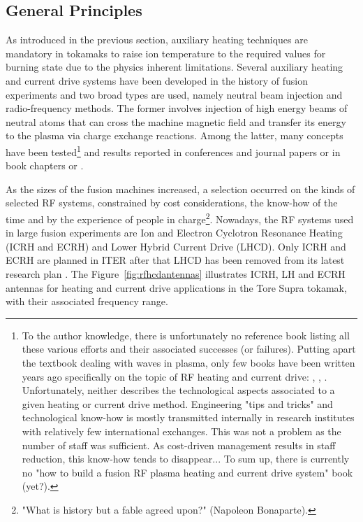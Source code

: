 \subsection{General Principles}
As introduced in the previous section, auxiliary heating techniques are mandatory in tokamaks to raise ion temperature to the required values for burning state due to the physics inherent limitations. Several auxiliary heating and current drive systems have been developed in the history of fusion experiments and two broad types are used, namely neutral beam injection and radio-frequency methods. %
The former involves injection of high energy beams of neutral atoms that can cross the machine magnetic field and transfer its energy to the plasma via charge exchange reactions. Among the latter, many concepts have been tested\footnote{To the author knowledge, there is unfortunately no reference book listing all these various efforts and their associated successes (or failures). Putting apart the textbook dealing with waves in plasma, only few books have been written years ago specifically on the topic of RF heating and current drive: , , . Unfortunately, neither describes the technological aspects associated to a given heating or current drive method. Engineering "tips and tricks" and technological know-how is mostly transmitted internally in research institutes with relatively few international exchanges. This was not a problem as the number of staff was sufficient. As cost-driven management results in staff reduction, this know-how tends to disappear... To sum up, there is currently no "how to build a fusion RF plasma heating and current drive system" book (yet?).} and results reported in conferences and journal papers  or in book chapters  or . 

As the sizes of the fusion machines increased, a selection occurred on the kinds of selected RF systems, constrained by cost considerations, the know-how of the time and by the experience of people in charge\footnote{"What is history but a fable agreed upon?" (Napoleon Bonaparte).}. Nowadays, the RF systems used in large fusion experiments are Ion and Electron Cyclotron Resonance Heating (ICRH and ECRH) and Lower Hybrid Current Drive (LHCD). Only ICRH and ECRH are planned in ITER after that LHCD has been removed from its latest research plan . The Figure~\ref{fig:rfhcdantennas} illustrates ICRH, LH and ECRH antennas for heating and current drive applications in the Tore Supra tokamak, with their associated frequency range.

